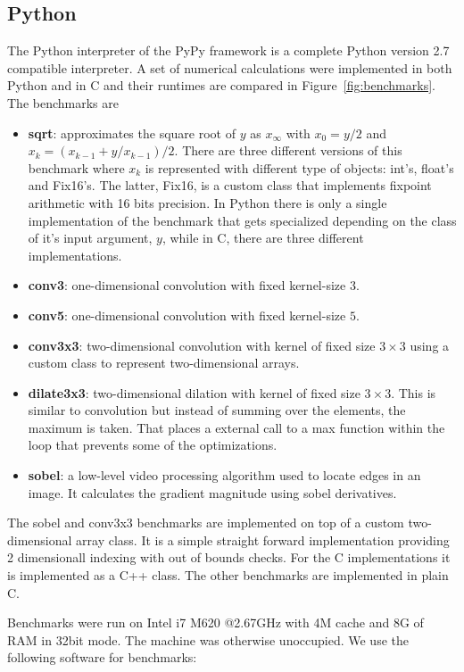 \documentclass[preprint]{sigplanconf}
\begin{document}
\subsection{Python}
The Python interpreter of the PyPy framework is a complete Python
version 2.7 compatible interpreter. A set of numerical
calculations were implemented in both Python and in C and their
runtimes are compared in Figure~\ref{fig:benchmarks}. The benchmarks are
\begin{itemize}
\item {\bf sqrt}: approximates the square root of $y$ as $x_\infty$
  with $x_0=y/2$ and $x_k = \left( x_{k-1} + y/x_{k-1} \right) /
  2$. There are three different versions of this benchmark where $x_k$
  is represented with different type of objects: int's, float's and
  Fix16's. The latter, Fix16, is a custom class that implements
  fixpoint arithmetic with 16 bits precision. In Python there is only
  a single implementation of the benchmark that gets specialized
  depending on the class of it's input argument, $y$, while in C,
  there are three different implementations.
\item {\bf conv3}: one-dimensional convolution with fixed kernel-size $3$.
\item {\bf conv5}: one-dimensional convolution with fixed kernel-size $5$.
\item {\bf conv3x3}: two-dimensional convolution with kernel of fixed
  size $3 \times 3$ using a custom class to represent two-dimensional
  arrays.
\item {\bf dilate3x3}: two-dimensional dilation with kernel of fixed
  size $3 \times 3$. This is similar to convolution but instead of
  summing over the elements, the maximum is taken. That places a
  external call to a max function within the loop that prevents some
  of the optimizations.
\item {\bf sobel}: a low-level video processing algorithm used to
  locate edges in an image. It calculates the gradient magnitude
  using sobel derivatives. 
\end{itemize}

The sobel and conv3x3 benchmarks are implemented
on top of a custom two-dimensional array class.
It is
a simple straight forward implementation providing 2 dimensionall
indexing with out of bounds checks. For the C implementations it is
implemented as a C++ class. The other benchmarks are implemented in
plain C. 

Benchmarks were run on Intel i7 M620 @2.67GHz with 4M cache and 8G of RAM in
32bit mode.
The machine was otherwise unoccupied. We use the following software
for benchmarks:
\end{document}
